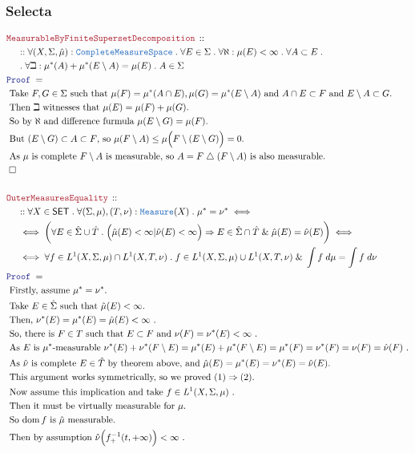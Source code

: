 \documentclass[12pt]{scrartcl}
\newcommand{\TYPE}[1]{\textcolor{NavyBlue}{\mathtt{#1}}}
\newcommand{\LOGIC}[1]{\textcolor{Blue}{\mathtt{#1}}}
\newcommand{\THM}[1]{\textcolor{Maroon}{\mathtt{#1}}}
\renewcommand{\.}{\; . \;}
\newcommand{\Theorem}[2]{& \THM{#1} \, :: \, #2 \\ & \Proof = \\ }
\newcommand{\NewLine}{\\ & \kern 1pc}
\newcommand{\Page}[1]{ \begin{align*} #1 \end{align*}   }
\renewcommand{\And}{\; \& \;}
\newcommand{\Imply}{\Rightarrow}
\newcommand{\du}{\; \triangle \;}
\newcommand{\QED}{\; \square}
\newcommand{\EndProof}{& \QED \\}
\newcommand{\Proof}{\LOGIC{Proof} \; }
\newcommand{\Explain}[1]{& \text{#1.} \\}
\DeclareMathOperator*{\dom}{dom}
\newcommand{\SET}{\mathsf{SET}}
\newcommand{\Measure}{\TYPE{Measure}}
\newcommand{\CMS}{\TYPE{CompleteMeasureSpace}}
\begin{document}
\subsubsection{Selecta}
\Page{
	\Theorem{MeasurableByFiniteSupersetDecomposition}
	{
		\NewLine ::		
		\forall (X,\Sigma,\hat \mu) : \CMS \.
		\forall E \in \Sigma \.
		\forall \aleph : \mu(E) < \infty \.
		\forall A \subset E \. \NewLine \.
		\forall \beth :  \mu^*(A) + \mu^*(E \setminus A) = \mu(E) \.
		A \in \Sigma	
	}
	\Explain{
		Take $F,G \in \Sigma$ such that $\mu(F) = \mu^*(A \cap E),\mu(G) = \mu^*(E \setminus A )$ 
		and $A \cap E \subset F$ and $E \setminus A \subset G$}
	\Explain{
		Then $\beth$ witnesses that $\mu(E) = \mu(F) + \mu(G)$}
	\Explain{
		So by $\aleph$ and difference furmula $\mu(E \setminus G) = \mu(F)$}
	\Explain{
		But $  (E \setminus G) \subset A \subset F$, 
		so $\mu( F \setminus A)  \le \mu\Big( F \setminus (E \setminus G) \Big) = 0 $}
	\Explain{
		As $\mu$ is complete $F \setminus A$ is measurable, so $A = F \du (F \setminus A)$ 
		is also measurable}
	\EndProof
	\\
	\Theorem{OuterMeasuresEquality}
	{
		\NewLine ::		
		\forall X \in \SET \.
		\forall (\Sigma,\mu),(T,\nu) : \Measure(X) \.
		\mu^* = \nu^*
		\iff
		\NewLine		
		\iff
		\bigg(
				\forall E \in \hat \Sigma \cup \hat T \.
				\Big( \hat\mu( E) < \infty | \hat \nu(E) < \infty \Big)
				\Imply
				E \in \hat \Sigma \cap \hat T 
				\And
				\hat \mu(E) = \hat \nu(E)
		\bigg)
		\iff
		\NewLine
		\iff
		\forall f \in L^1(X,\Sigma,\mu) \cap L^1(X,T,\nu) \. 
		f \in  L^1(X,\Sigma,\mu) \cup L^1(X,T,\nu) \And
		\int f \; d \mu = \int  f \; d \nu
	}
	\Explain{
		Firstly, assume $\mu^* = \nu^*$}
	\Explain{ 
		Take $E \in \hat \Sigma$  such that $\hat \mu(E)<\infty$}
	\Explain{
		Then, $\nu^*(E) =\mu^*(E) = \hat \mu(E) < \infty$
	}
	\Explain{
		So, there is $F \in T$ such that $E \subset F$ and $\nu(F) = \nu^*(E) < \infty$
	}
	\Explain{   
		As $E$ is $\mu^*$-measurable		
		$ 
			\nu^*(E)  + \nu^*(F \setminus E)  = 
			\mu^*(E) + \mu^*(F \setminus E)  = 
			\mu^*(F) =
			\nu^*(F) =
			\nu(F) = \hat \nu (F)
		$    
	}
	\Explain{
		As $\hat \nu$ is complete $E \in \hat T$ by theorem above, 
		and $\hat \mu (E) = \mu^*(E) = \nu^*(E) = \hat \nu(E)$}
	\Explain{
		This argument works symmetrically, so we proved $(1) \Imply (2)$}
	\Explain{
		Now assume this implication and take $f \in  L^1(X,\Sigma,\mu)$
	}
	\Explain{
		Then it must be virtually measurable for $\mu$}
	\Explain{
			So $\dom f$ is $\hat \mu$ measurable}
	\Explain{
		Then by assumption $\hat \nu \Big( f^{-1}_+(t,+\infty)\Big) < \infty$
}}
\end{document}
